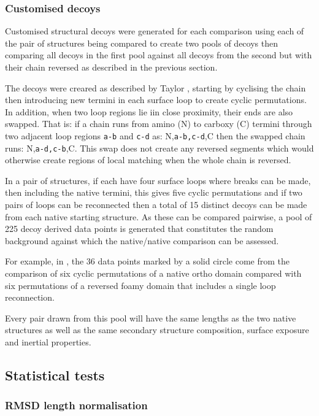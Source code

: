 \subsubsection{Customised decoys}

Customised structural decoys were generated for each comparison using each of the
pair of structures being compared to create two pools of decoys then comparing all
decoys in the first pool against all decoys from the second but with their chain
reversed as described in the previous section.

The decoys were creared as described by Taylor \cite{}, starting by cyclising the
chain then introducing new termini in each surface loop to create cyclic permutations.
In addition, when two loop regions lie iin close proximity, their ends are also 
swapped.   That is: if a chain runs from amino (N) to carboxy (C) termini through
two adjacent loop regions {\tt a-b} and {\tt c-d} as: N,{\tt a-b,c-d},C then the swapped chain runs:
N,{\tt a-d,c-b},C.   This swap does not create any reversed segments which would otherwise
create regions of local matching when the whole chain is reversed.

In a pair of structures, if each have four surface loops where breaks can be made, then
including the native termini, this gives five cyclic permutations and if two pairs of 
loops can be reconnected then a total of 15 distinct decoys can be made from each native
starting structure.   As these can be compared pairwise, a pool of 225 decoy derived
data points is generated that constitutes the random background against which the native/native
comparison can be assessed.

For example, in , the 36 data
points marked by a solid circle come from the comparison of six cyclic permutations of a 
native ortho domain compared with six permutations of a reversed foamy domain that includes
a single loop reconnection.  

Every pair drawn from this pool will have the same lengths as the two native structures
as well as the same secondary structure composition, surface exposure and inertial properties.


\subsection{Statistical tests}

\subsubsection{RMSD length normalisation}

